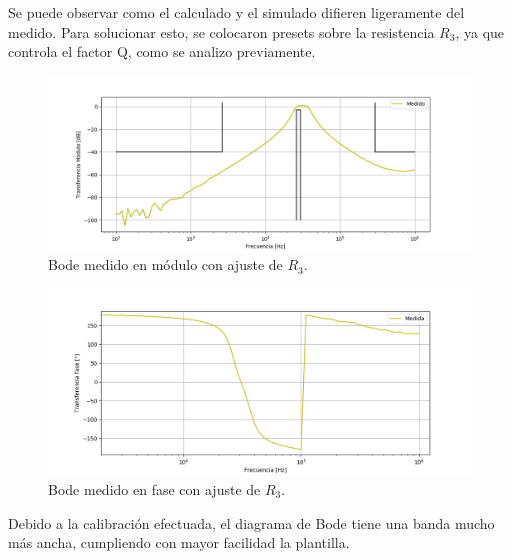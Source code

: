 Se puede observar como el calculado y el simulado difieren ligeramente del medido. Para solucionar esto, se colocaron presets sobre la resistencia $R_3$, ya que controla el factor Q, como se analizo previamente.
\begin{figure}[H]
	\centering
	\includegraphics[width=\textwidth]{Imagenes-Ej2/BodeRauchV2.png}
	\caption{Bode medido en módulo con ajuste de $R_3$.}
	\label{fig:bodemmr}
\end{figure}
\begin{figure}[H]
	\centering
	\includegraphics[width=\textwidth]{Imagenes-Ej2/BodeRauchFaseV2.png}
	\caption{Bode medido en fase con ajuste de $R_3$.}
	\label{fig:bodemfr}
\end{figure}

Debido a la calibración efectuada, el diagrama de Bode tiene una banda mucho más ancha, cumpliendo con mayor facilidad la plantilla.

